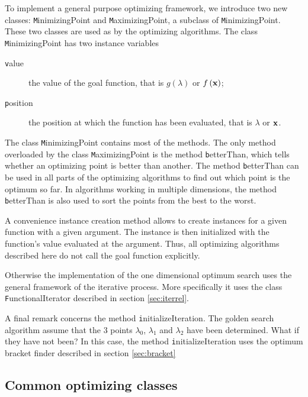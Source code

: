 To implement a general purpose optimizing framework, we introduce
two new classes: {\texttt MinimizingPoint} and {\texttt MaximizingPoint},
 a subclass of {\texttt MinimizingPoint}. These two classes
are used as  by the optimizing algorithms. The
class {\texttt MinimizingPoint} has two instance variables
\begin{description}
  \item[\texttt value] the value of the goal function, that is
  $g\left(\lambda\right)$ or $f\left({\textbf x}\right)$;
  \item[\texttt position] the position at which the function has been
  evaluated, that is $\lambda$ or ${\textbf x}$.
\end{description}
The class {\texttt MinimizingPoint} contains most of the methods. The
only method overloaded by the class {\texttt MaximizingPoint} is the
method {\texttt betterThan}, which tells whether an optimizing point
is better than another. The method {\texttt betterThan} can be used in
all parts of the optimizing algorithms to find out which point is
the optimum so far. In algorithms working in multiple dimensions,
the method {\texttt betterThan} is also used to sort the points from
the best to the worst.

A convenience instance creation method allows to create instances
for a given function with a given argument. The instance is then
initialized with the function's value evaluated at the argument.
Thus, all optimizing algorithms described here do not call the
goal function explicitly.

Otherwise the implementation of the one dimensional optimum search
uses the general framework of the iterative process. More
specifically it uses the class {\texttt FunctionalIterator} described
in section \ref{sec:iterrel}.

A final remark concerns the method {\texttt initializeIteration}. The
golden search algorithm assume that the 3 points $\lambda_0$,
$\lambda_1$ and $\lambda_2$ have been determined. What if they
have not been? In this case, the method {\texttt initializeIteration}
uses the optimum bracket finder described in section
\ref{sec:bracket}

\subsection{Common optimizing classes}

